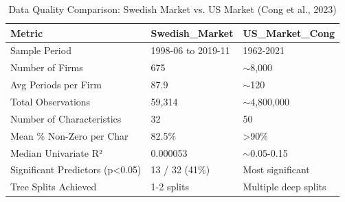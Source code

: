 \begin{table}[ht]
\centering
\caption{Data Quality Comparison: Swedish Market vs. US Market (Cong et al., 2023)} 
\label{tab:market_comparison}
\begin{tabular}{lll}
  \hline
Metric & Swedish_Market & US_Market_Cong \\ 
  \hline
Sample Period & 1998-06 to 2019-11 & 1962-2021 \\ 
  Number of Firms & 675 & $\sim$8,000 \\ 
  Avg Periods per Firm & 87.9 & $\sim$120 \\ 
  Total Observations & 59,314 & $\sim$4,800,000 \\ 
  Number of Characteristics & 32 & 50 \\ 
  Mean \% Non-Zero per Char & 82.5\% & >90\% \\ 
  Median Univariate R² & 0.000053 & $\sim$0.05-0.15 \\ 
  Significant Predictors (p<0.05) & 13 / 32 (41\%) & Most significant \\ 
  Tree Splits Achieved & 1-2 splits & Multiple deep splits \\ 
   \hline
\end{tabular}
\end{table}
